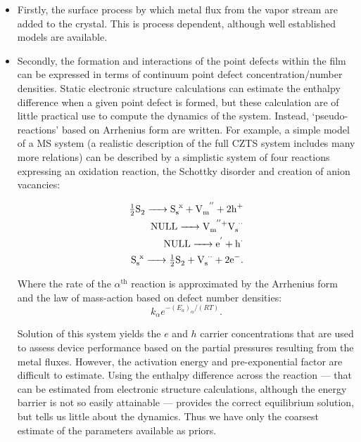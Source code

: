 \documentclass[11pt]{article}
\begin{document}
\begin{itemize}
  \item Firstly, the surface process by which metal flux from the vapor
  stream are added to the crystal. This is process dependent, although
  well established models are available. 

\item Secondly, the formation and interactions of the point defects
  within the film can be expressed in terms of continuum point defect
  concentration/number densities. Static electronic structure
  calculations can estimate the enthalpy difference when a given point
  defect is formed, but these calculation are of little practical use
  to compute the dynamics of the system. Instead, `pseudo-reactions'
  based on Arrhenius form are written. For example, a simple model of a
  MS system (a realistic description of the full CZTS system includes
  many more relations) can be described by a simplistic system of four
  reactions expressing an oxidation reaction, the Schottky disorder
  and creation of anion vacancies:

\begin{eqnarray*}
\ce{ \tfrac{1}{2} S2 -> S_s^x + V_m^{''} + 2 h^+ } \\
\ce{ NULL -> V_m^{''}+ V_s^{$\cdot \cdot$} } \\
\ce{ NULL -> e^' + h^{$\cdot$} } \\
\ce{ S_s^x -> \tfrac{1}{2} S2 + V_s^{$\cdot \cdot$} + 2 e^- }.
\end{eqnarray*}

Where the rate of the $\alpha^{\mathrm{th}}$ reaction is approximated
by the Arrhenius form and the law of mass-action based on defect
number densities:
\begin{equation}
  \label{eq:1}
  k_\alpha e^{-(E_a)_\alpha/(RT)}.
\end{equation}

Solution of this system yields the $e$ and $h$ carrier
concentrations that are used to assess device performance based on the
partial pressures resulting from the metal fluxes. However, the
activation energy and pre-exponential factor are difficult to
estimate. Using the enthalpy difference across the reaction --- that
can be estimated from electronic structure calculations, although the
energy barrier is not so easily attainable --- provides
the correct equilibrium solution, but tells us little about the
dynamics. Thus we have only the coarsest estimate of the parameters
available as priors.


\end{itemize}
\end{document}

